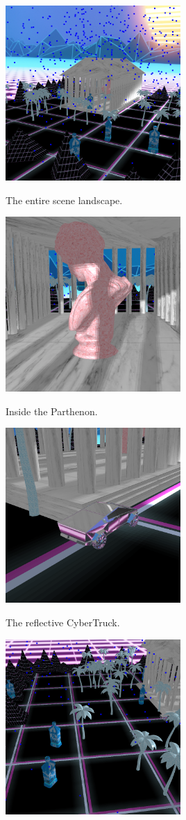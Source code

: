 \documentclass[10pt,letterpaper,oneside]{article}
\numberwithin{equation}{section}		%
\numberwithin{figure}{section}			%
\numberwithin{table}{section}				%
\begin{document}
\begin{center}
    \includegraphics[width=0.5\textwidth]{scene1.png}
    
    The entire scene landscape.
    
    \includegraphics[width=0.5\textwidth]{scene2.png}
    
    Inside the Parthenon.
    
    \includegraphics[width=0.5\textwidth]{scene3.png}
    
    The reflective CyberTruck.
    
    \includegraphics[width=0.5\textwidth]{scene4.png}
    

\end{center}
\end{document}
